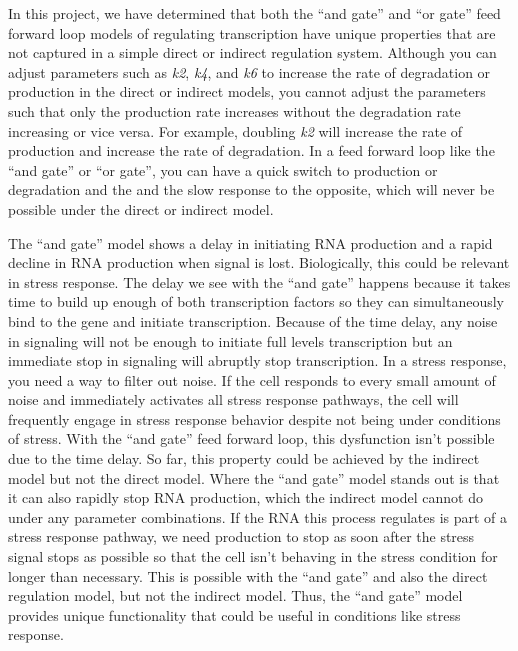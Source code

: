 \documentclass{article}
\begin{document}
In this project, we have determined that both the ``and gate'' and ``or gate'' feed forward loop models of regulating transcription have unique properties that are not captured in a simple direct or indirect regulation system. Although you can adjust parameters such as \textit{k2}, \textit{k4}, and \textit{k6} to increase the rate of degradation or production in the direct or indirect models, you cannot adjust the parameters such that only the production rate increases without the degradation rate increasing or vice versa. For example, doubling \textit{k2} will increase the rate of production and increase the rate of degradation. In a feed forward loop like the ``and gate'' or ``or gate'', you can have a quick switch to production or degradation and the and the slow response to the opposite, which will never be possible under the direct or indirect model.  

The ``and gate'' model shows a delay in initiating RNA production and a rapid decline in RNA production when signal is lost. Biologically, this could be relevant in stress response. The delay we see with the ``and gate'' happens because it takes time to build up enough of both transcription factors so they can simultaneously bind to the gene and initiate transcription. Because of the time delay, any noise in signaling will not be enough to initiate full levels transcription but an immediate stop in signaling will abruptly stop transcription. In a stress response, you need a way to filter out noise. If the cell responds to every small amount of noise and immediately activates all stress response pathways, the cell will frequently engage in stress response behavior despite not being under conditions of stress. With the ``and gate'' feed forward loop, this dysfunction isn't possible due to the time delay. So far, this property could be achieved by the indirect model but not the direct model. Where the ``and gate'' model stands out is that it can also rapidly stop RNA production, which the indirect model cannot do under any parameter combinations. If the RNA this process regulates is part of a stress response pathway, we need production to stop as soon after the stress signal stops as possible so that the cell isn't behaving in the stress condition for longer than necessary. This is possible with the ``and gate'' and also the direct regulation model, but not the indirect model. Thus, the ``and gate'' model provides unique functionality that could be useful in conditions like stress response. 
\end{document}

